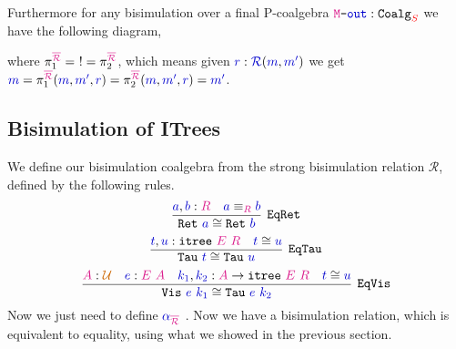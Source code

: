 \documentclass[twoside,11pt,openright]{report}
\newcommand*{\term}[1]{\textcolor{blue!80!black}{#1}}
\newcommand*{\type}[1]{\textcolor{magenta!90!black}{#1}}
\newcommand*{\container}[1]{\textcolor{red}{#1}}
\newcommand*{\universe}[1]{\textcolor{orange!80!black}{#1}}
\newcommand*{\coalg}[2]{#1\texttt{-}#2}
\begin{document}
\begin{figure}[h]
  \centering
\end{figure}
\noindent Furthermore for any bisimulation over a final P-coalgebra \(\coalg{\type{\mathtt{M}}}{\term{\mathtt{out}}}:\mathtt{Coalg}_{\container{S}}\) we have the following diagram,

\begin{figure}[h]
  \centering
\end{figure}
\noindent where \(\pi_1^{\type{\overline{\mathcal{R}}}} = ~! = \pi_2^{\type{\overline{\mathcal{R}}}}\), which means given \(\term{r} : \term{\mathcal{R}}(\term{m},\term{m'})\) we get \(\term{m} = \pi_1^{\type{\overline{\mathcal{R}}}} (\term{m}, \term{m'}, \term{r}) = \pi_2^{\type{\overline{\mathcal{R}}}} (\term{m}, \term{m'}, \term{r}) = \term{m'}\).


\subsection{Bisimulation of ITrees}
We define our bisimulation coalgebra from the strong bisimulation relation \(\mathcal{R}\), defined by the following rules.
\begin{equation}
  \infer[\mathtt{EqRet}]{\mathtt{Ret}~\term{a} \cong \mathtt{Ret}~\term{b}}{\term{a},\term{b} : \type{R} & \term{a} \equiv_{\type{R}} \term{b}}
\end{equation}
\begin{equation}
  \infer[\mathtt{EqTau}]{\mathtt{Tau}~\term{t} \cong \mathtt{Tau}~\term{u}}{\term{t},\term{u} : \mathtt{itree}~\type{E}~\type{R} & \term{t} \cong \term{u}}
\end{equation}
\begin{equation}
  \infer[\mathtt{EqVis}]{\mathtt{Vis}~\term{e}~\term{k_1} \cong \mathtt{Tau}~\term{e}~\term{k_2}}{\type{A} : \universe{\mathcal{U}} & \term{e} : \type{E}~\type{A} & \term{k_1},\term{k_2} : \type{A} \rightarrow \mathtt{itree}~\type{E}~\type{R} & \term{t} \cong \term{u}}
\end{equation}
Now we just need to define \(\term{\alpha}_{\type{\overline{\mathcal{R}}}}\) . Now we have a bisimulation relation, which is equivalent to equality, using what we showed in the previous section.
\end{document}
